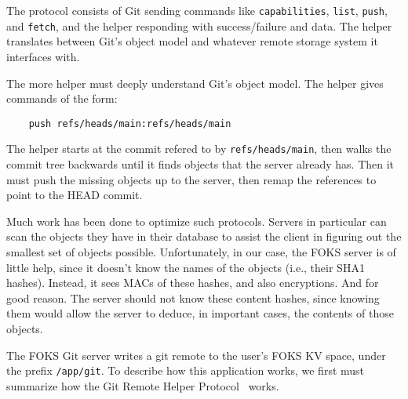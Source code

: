 The protocol consists of Git sending commands like \texttt{capabilities},
\texttt{list}, \texttt{push}, and \texttt{fetch}, and the helper responding
with success/failure and data. The helper translates between
Git's object model and whatever remote storage system it interfaces with.

The more helper must deeply understand Git's object model. The 
helper gives commands of the form:
%
\begin{verbatim}
    push refs/heads/main:refs/heads/main
\end{verbatim}
%
The helper starts at the commit refered to by \texttt{refs/heads/main},
then walks the commit tree backwards until it finds objects that the
server already has. Then it must push the missing objects up to the server,
then remap the references to point to the HEAD commit.

Much work has been done to optimize such protocols. Servers in particular
can scan the objects they have in their database to assist the client
in figuring out the smallest set of objects possible. Unfortunately,
in our case, the FOKS server is of little help, since it doesn't
know the names of the objects (i.e., their SHA1 hashes). Instead, it
sees MACs of these hashes, and also encryptions. And for good reason.
The server should not know these content hashes, since knowing them
would allow the server to deduce, in important cases, the contents
of those objects.

The FOKS Git server writes a git remote to the user's 
FOKS KV space, under the prefix \texttt{/app/git}. To describe
how this application works, we first must summarize how the Git
Remote Helper Protocol~\cite{git-remote-helper} works.